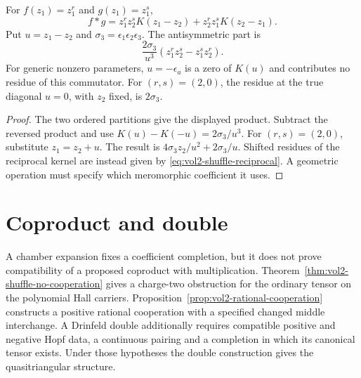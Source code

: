 \begin{calculation}
For $f(z_1)=z_1^r$ and $g(z_1)=z_1^s$,
\[
 f*g
 =z_1^rz_2^sK(z_1-z_2)+z_2^rz_1^sK(z_2-z_1).
\]
Put $u=z_1-z_2$ and $\sigma_3=\epsilon_1\epsilon_2\epsilon_3$.
The antisymmetric part is
\[
 \frac{2\sigma_3}{u^3}
 (z_1^rz_2^s-z_1^sz_2^r).
\]
For generic nonzero parameters, $u=-\epsilon_a$ is a zero of
$K(u)$ and contributes no residue of this commutator.
For $(r,s)=(2,0)$, the residue at the true diagonal $u=0$,
with $z_2$ fixed, is $2\sigma_3$.
\end{calculation}
\begin{proof}
The two ordered partitions give the displayed product.
Subtract the reversed product and use
$K(u)-K(-u)=2\sigma_3/u^3$.
For $(r,s)=(2,0)$, substitute $z_1=z_2+u$.
The result is $4\sigma_3z_2/u^2+2\sigma_3/u$.
Shifted residues of the reciprocal kernel are instead given by
\eqref{eq:vol2-shuffle-reciprocal}. A geometric operation must specify
which meromorphic coefficient it uses.
\end{proof}

\section{Coproduct and double}
A chamber expansion fixes a coefficient completion, but it does not
prove compatibility of a proposed coproduct with multiplication.
Theorem~\ref{thm:vol2-shuffle-no-cooperation} gives a charge-two
obstruction for the ordinary tensor on the polynomial Hall carriers.
Proposition~\ref{prop:vol2-rational-cooperation} constructs a positive
rational cooperation with a specified changed middle interchange.
A Drinfeld double additionally requires compatible positive and negative
Hopf data, a continuous pairing and a completion in which its canonical
tensor exists. Under those hypotheses the double construction gives
the quasitriangular structure.

